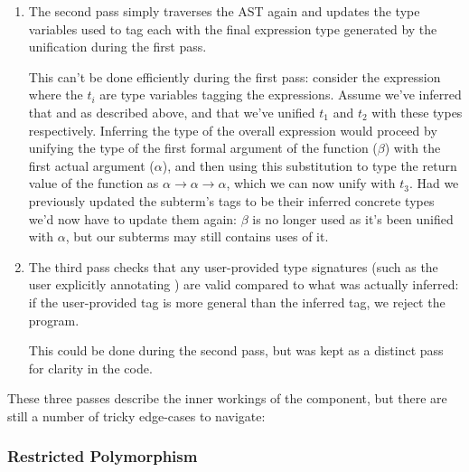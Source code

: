 \documentclass[dissertation.tex]{subfiles}
\begin{document}
{{\begin{enumerate}
{        }
        \item
        {

            The second pass simply traverses the AST again and updates the type variables used to tag each with the
            final expression type generated by the unification during the first pass.
            
            This can't be done efficiently during the first pass: consider the expression  where the \(t_i\) are type variables tagging the expressions. Assume we've
            inferred that  and \haskell{(+) ::
            #\(\beta\rightarrow\beta\rightarrow\beta\)#} as described above, and that we've unified \(t_1\) and
            \(t_2\) with these types respectively. Inferring the type of the overall expression would proceed by
            unifying the type of the first formal argument of the function (\(\beta\)) with the first actual
            argument (\(\alpha\)), and then using this substitution to type the return value of the function as
            \(\alpha\rightarrow\alpha\rightarrow\alpha\), which we can now unify with \(t_3\). Had we previously
            updated the subterm's tags to be their inferred concrete types we'd now have to update them again:
            \(\beta\) is no longer used as it's been unified with \(\alpha\), but our subterms may still contains
            uses of it.

        }
        \item
        {

            The third pass checks that any user-provided type signatures (such as the user explicitly annotating
            ) are valid compared to what was actually inferred: if the user-provided tag is more
            general than the inferred tag, we reject the program.

            This could be done during the second pass, but was kept as a distinct pass for clarity in the code.

        }
        \end{enumerate}

        These three passes describe the inner workings of the component, but there are still a number of tricky
        edge-cases to navigate:

        \subsubsection{Restricted Polymorphism}
        {

}}}
\end{document}
